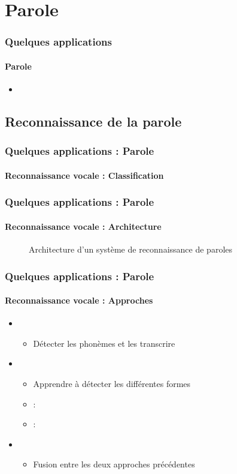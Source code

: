 \documentclass[xcolor=table]{beamer}
\begin{document}
\section{Parole}

\begin{frame}
	\frametitle{Quelques applications}
	\framesubtitle{Parole}
	\begin{itemize}
		\item 
	\end{itemize}
\end{frame}

\subsection{Reconnaissance de la parole}

\begin{frame}
	\frametitle{Quelques applications : Parole}
	\framesubtitle{Reconnaissance vocale : Classification}
\end{frame}


\begin{frame}
	\frametitle{Quelques applications : Parole}
	\framesubtitle{Reconnaissance vocale : Architecture}
	\begin{figure}
		\centering
		\caption{Architecture d'un système de reconnaissance de paroles \cite{18-haridas}}
	\end{figure}
\end{frame}


\begin{frame}
	\frametitle{Quelques applications : Parole}
	\framesubtitle{Reconnaissance vocale : Approches}
	\begin{itemize}
		\item {}
		\begin{itemize}
			\item Détecter les phonèmes et les transcrire
		\end{itemize}
		\item {}
		\begin{itemize}
			\item Apprendre à détecter les différentes formes
			\item {} : 
			\item {} : 
		\end{itemize}
		\item {}
		\begin{itemize}
			\item Fusion entre les deux approches précédentes
		\end{itemize}
	\end{itemize}
\end{frame}
\end{document}
